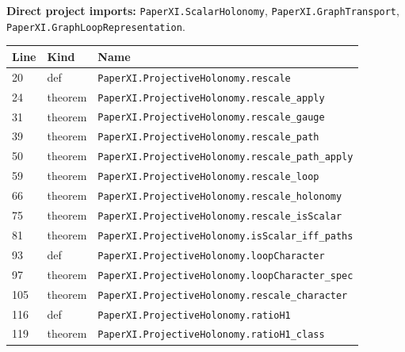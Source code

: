 \documentclass[10pt,oneside]{book}
\begin{document}

\textbf{Direct project imports:} \nolinkurl{PaperXI.ScalarHolonomy}, \nolinkurl{PaperXI.GraphTransport}, \nolinkurl{PaperXI.GraphLoopRepresentation}.

\begin{longtable}{@{}p{}p{}p{}@{}}\toprule Line&Kind&Name\\\midrule\endhead

20&def&\nolinkurl{PaperXI.ProjectiveHolonomy.rescale}\\

24&theorem&\nolinkurl{PaperXI.ProjectiveHolonomy.rescale_apply}\\

31&theorem&\nolinkurl{PaperXI.ProjectiveHolonomy.rescale_gauge}\\

39&theorem&\nolinkurl{PaperXI.ProjectiveHolonomy.rescale_path}\\

50&theorem&\nolinkurl{PaperXI.ProjectiveHolonomy.rescale_path_apply}\\

59&theorem&\nolinkurl{PaperXI.ProjectiveHolonomy.rescale_loop}\\

66&theorem&\nolinkurl{PaperXI.ProjectiveHolonomy.rescale_holonomy}\\

75&theorem&\nolinkurl{PaperXI.ProjectiveHolonomy.rescale_isScalar}\\

81&theorem&\nolinkurl{PaperXI.ProjectiveHolonomy.isScalar_iff_paths}\\

93&def&\nolinkurl{PaperXI.ProjectiveHolonomy.loopCharacter}\\

97&theorem&\nolinkurl{PaperXI.ProjectiveHolonomy.loopCharacter_spec}\\

105&theorem&\nolinkurl{PaperXI.ProjectiveHolonomy.rescale_character}\\

116&def&\nolinkurl{PaperXI.ProjectiveHolonomy.ratioH1}\\

119&theorem&\nolinkurl{PaperXI.ProjectiveHolonomy.ratioH1_class}\\


\end{longtable}
\end{document}
